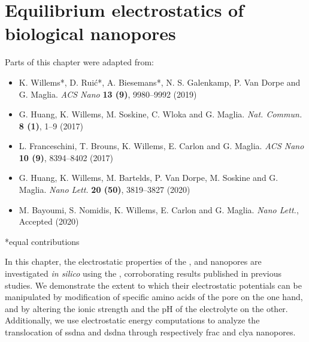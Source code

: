 \chapter{Equilibrium electrostatics of biological nanopores}
%
\label{ch:electrostatics}
%

%
%


%
%
\begin{shaded}
Parts of this chapter were adapted from:
%
\begin{itemize}
  \item K. Willems*, D. Rui\'{c}*, A. Biesemans*, N. S. Galenkamp, P. Van Dorpe and G. Maglia.
        \textit{ACS Nano} \textbf{13 (9)}, 9980--9992 (2019) %
  \item G. Huang, K. Willems, M. Soskine, C. Wloka and G. Maglia.
        \textit{Nat. Commun.} \textbf{8 (1)}, 1--9 (2017) %
  \item L. Franceschini,  T. Brouns, K. Willems, E. Carlon and G. Maglia.
        \textit{ACS Nano} \textbf{10 (9)}, 8394--8402 (2017) %
  \item G. Huang, K. Willems, M. Bartelds, P. Van Dorpe, M. Soskine and G. Maglia.
        \textit{Nano Lett.} \textbf{20 (50)}, 3819--3827 (2020) %
  \item M. Bayoumi, S. Nomidis, K. Willems, E. Carlon and G. Maglia.
        \textit{Nano Lett.}, Accepted (2020) %
\end{itemize}
%
*equal contributions
%
\newpage
\end{shaded}
%
%


In this chapter, the electrostatic properties of the ,  and 
nanopores are investigated \textit{in silico} using the , corroborating results published in
previous studies. We demonstrate the extent to which their electrostatic potentials can be manipulated by
modification of specific amino acids of the pore on the one hand, and by altering the ionic strength and the
pH of the electrolyte on the other. Additionally, we use electrostatic energy computations to analyze the
translocation of \gls{ssdna} and \gls{dsdna} through respectively \gls{frac} and \gls{clya} nanopores. \\
%


